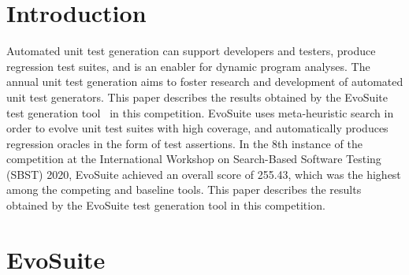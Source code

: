 \documentclass[sigconf]{acmart}
\newcommand{\EVOSUITE}{{\sc EvoSuite}\xspace}
\newcommand{\TOTALPOINTS}{{255.43}\xspace}
\begin{document}
\maketitle

\section{Introduction}


Automated unit test generation can support developers and testers, produce
regression test suites, and is an enabler for dynamic program analyses. The
annual unit test generation aims to foster research and development of
automated unit test generators. This paper describes the results obtained by
the \EVOSUITE test generation tool~\cite{FrA11c} in this competition. \EVOSUITE
uses meta-heuristic search in order to evolve unit test suites with high
coverage, and automatically produces regression oracles in the form of test
assertions. In the 8th instance of the competition at the International
Workshop on Search-Based Software Testing (SBST) 2020, \EVOSUITE achieved an
overall score of \TOTALPOINTS, which was the highest among the competing and
baseline tools. This paper describes the results obtained by the \EVOSUITE test
generation tool in this competition.



\section{\EVOSUITE}
\end{document}
